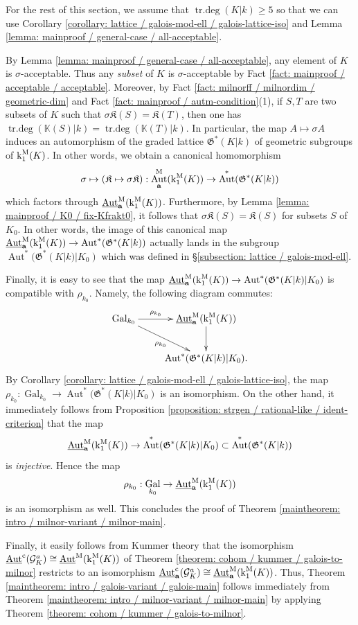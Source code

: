 \documentclass[11pt]{amsart}
\theoremstyle{definition}
\theoremstyle{remark}
\numberwithin{equation}{section}
\DeclareMathOperator{\Aut}{Aut}
\DeclareMathOperator{\Gal}{Gal}
\DeclareMathOperator{\trdeg}{tr.deg}
\newcommand{\Kbb}{\mathbb{K}}
\newcommand{\Gc}{\mathcal{G}}
\newcommand{\abf}{\mathbf{a}}
\newcommand{\Kfrak}{\mathfrak{K}}
\newcommand{\Gfrak}{\mathfrak{G}}
\newcommand{\Autm}{\Aut^{\rm M}}
\newcommand{\UAutc}{\underline{\Aut}^{\rm c}}
\newcommand{\UAutm}{\underline{\Aut}^{\rm M}}
\renewcommand{\k}{\operatorname{k}^{\rm M}}
\newcommand{\Galk}{{\Gal_{k_0}}}
\begin{document}
For the rest of this section, we assume that $\trdeg(K|k) \geq 5$ so that we can use Corollary \ref{corollary: lattice / galois-mod-ell / galois-lattice-iso} and Lemma \ref{lemma: mainproof / general-case / all-acceptable}.

By Lemma \ref{lemma: mainproof / general-case / all-acceptable}, any element of $K$ is $\sigma$-acceptable.
Thus any \emph{subset} of $K$ is $\sigma$-acceptable by Fact \ref{fact: mainproof / acceptable / acceptable}.
Moreover, by Fact \ref{fact: milnorff / milnordim / geometric-dim} and Fact \ref{fact: mainproof / autm-condition}(1), if $S,T$ are two subsets of $K$ such that $\sigma\Kfrak(S) = \Kfrak(T)$, then one has $\trdeg(\Kbb(S)|k) = \trdeg(\Kbb(T)|k)$.
In particular, the map $A \mapsto \sigma A$ induces an automorphism of the graded lattice $\Gfrak^*(K|k)$ of geometric subgroups of $\k_1(K)$.
In other words, we obtain a canonical homomorphism
\[ \sigma \mapsto (\Kfrak \mapsto \sigma \Kfrak) : \Autm_\abf(\k_1(K)) \rightarrow \Aut^*(\Gfrak^*(K|k)) \]
which factors through $\UAutm_\abf(\k_1(K))$.
Furthermore, by Lemma \ref{lemma: mainproof / K0 / fix-Kfrakt0}, it follows that $\sigma\Kfrak(S) = \Kfrak(S)$ for subsets $S$ of $K_0$.
In other words, the image of this canonical map $\UAutm_\abf(\k_1(K)) \rightarrow \Aut^*(\Gfrak^*(K|k))$ actually lands in the subgroup $\Aut^*(\Gfrak^*(K|k)|K_0)$ which was defined in \S\ref{subsection: lattice / galois-mod-ell}.

Finally, it is easy to see that the map $\UAutm_\abf(\k_1(K)) \rightarrow \Aut^*(\Gfrak^*(K|k)|K_0)$ is compatible with $\rho_{k_0}$.
Namely, the following diagram commutes:
\[
\xymatrix{
  \Galk \ar[r]^-{\rho_{k_0}} \ar[dr]_{\rho_{k_0}} & \UAutm_\abf(\k_1(K))\ar[d] \\
  & \Aut^*(\Gfrak^*(K|k)|K_0).
}
\]
By Corollary \ref{corollary: lattice / galois-mod-ell / galois-lattice-iso}, the map $\rho_{k_0} : \Galk \rightarrow \Aut^*(\Gfrak^*(K|k)|K_0)$ is an isomorphism.
On the other hand, it immediately follows from Proposition \ref{proposition: strgen / rational-like / ident-criterion} that the map
\[ \UAutm_\abf(\k_1(K)) \rightarrow \Aut^*(\Gfrak^*(K|k)|K_0) \subset \Aut^*(\Gfrak^*(K|k)) \]
is \emph{injective}.
Hence the map
\[ \rho_{k_0} : \Galk \rightarrow \UAutm_\abf(\k_1(K)) \]
is an isomorphism as well.
This concludes the proof of Theorem \ref{maintheorem: intro / milnor-variant / milnor-main}.

Finally, it easily follows from Kummer theory that the isomorphism $\UAutc(\Gc_K^a) \cong \UAutm(\k_1(K))$ of Theorem \ref{theorem: cohom / kummer / galois-to-milnor} restricts to an isomorphism $\UAutc_\abf(\Gc_K^a) \cong \UAutm_\abf(\k_1(K))$.
Thus, Theorem \ref{maintheorem: intro / galois-variant / galois-main} follows immediately from Theorem \ref{maintheorem: intro / milnor-variant / milnor-main} by applying Theorem \ref{theorem: cohom / kummer / galois-to-milnor}.
\end{document}
